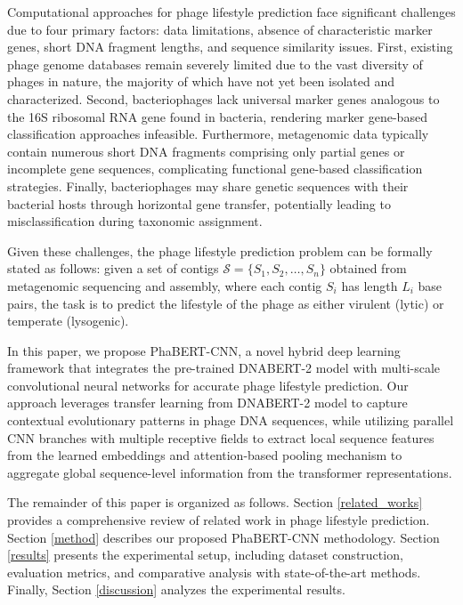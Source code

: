 \documentclass[runningheads]{llncs}
\begin{document}
Computational approaches for phage lifestyle prediction face significant challenges due to four primary factors: data limitations, absence of characteristic marker genes, short DNA fragment lengths, and sequence similarity issues. First, existing phage genome databases remain severely limited due to the vast diversity of phages in nature, the majority of which have not yet been isolated and characterized\cite{hayes2017metagenomic}. Second, bacteriophages lack universal marker genes analogous to the 16S ribosomal RNA gene found in bacteria, rendering marker gene-based classification approaches infeasible\cite{mokili2012metagenomics}. Furthermore, metagenomic data typically contain numerous short DNA fragments comprising only partial genes or incomplete gene sequences, complicating functional gene-based classification strategies\cite{jiang2017ensvmb}. Finally, bacteriophages may share genetic sequences with their bacterial hosts through horizontal gene transfer, potentially leading to misclassification during taxonomic assignment\cite{rozov2017recycler}.

Given these challenges, the phage lifestyle prediction problem can be formally stated as follows: given a set of contigs $\mathcal{S} = \{S_1, S_2, \ldots, S_n\}$ obtained from metagenomic sequencing and assembly, where each contig $S_i$ has length $L_i$ base pairs, the task is to predict the lifestyle of the phage as either virulent (lytic) or temperate (lysogenic).

In this paper, we propose PhaBERT-CNN, a novel hybrid deep learning framework that integrates the pre-trained DNABERT-2\cite{zhou2023dnabert} model with multi-scale convolutional neural networks for accurate phage lifestyle prediction. Our approach leverages transfer learning from DNABERT-2\cite{zhou2023dnabert} model to capture contextual evolutionary patterns in phage DNA sequences, while utilizing parallel CNN branches with multiple receptive fields to extract local sequence features from the learned embeddings and attention-based pooling mechanism to aggregate global sequence-level information from the transformer representations.

The remainder of this paper is organized as follows. Section \ref{related_works} provides a comprehensive review of related work in phage lifestyle prediction. Section \ref{method} describes our proposed PhaBERT-CNN methodology. Section \ref{results} presents the experimental setup, including dataset construction, evaluation metrics, and comparative analysis with state-of-the-art methods. Finally, Section \ref{discussion} analyzes the experimental results.
\end{document}
